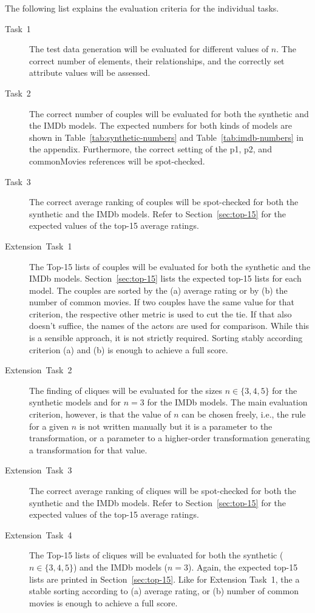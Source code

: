 \documentclass[a4paper,11pt]{article}
\newcommand{\p}[1]{\textsf{\small #1}}
\begin{document}
The following list explains the evaluation criteria for the individual tasks.

\begin{description}
\item[Task~1] The test data generation will be evaluated for different values
  of \(n\).  The correct number of elements, their relationships, and the
  correctly set attribute values will be assessed.
\item[Task~2] The correct number of couples will be evaluated for both the
  synthetic and the IMDb models.  The expected numbers for both kinds of models
  are shown in Table~\ref{tab:synthetic-numbers} and
  Table~\ref{tab:imdb-numbers} in the appendix.  Furthermore, the correct
  setting of the \p{p1}, \p{p2}, and \p{commonMovies} references will be
  spot-checked.
\item[Task~3] The correct average ranking of couples will be spot-checked for
  both the synthetic and the IMDb models.  Refer to Section~\ref{sec:top-15}
  for the expected values of the top-15 average ratings.
\item[Extension~Task~1] The Top-15 lists of couples will be evaluated for both
  the synthetic and the IMDb models.  Section~\ref{sec:top-15} lists the
  expected top-15 lists for each model.  The couples are sorted by the (a)
  average rating or by (b) the number of common movies.  If two couples have
  the same value for that criterion, the respective other metric is used to cut
  the tie.  If that also doesn't suffice, the names of the actors are used for
  comparison.  While this is a sensible approach, it is not strictly required.
  Sorting stably according criterion (a) and (b) is enough to achieve a full
  score.
\item[Extension~Task~2] The finding of cliques will be evaluated for the sizes
  \(n \in \{3,4,5\}\) for the synthetic models and for \(n=3\) for the IMDb
  models.  The main evaluation criterion, however, is that the value of \(n\)
  can be chosen freely, i.e., the rule for a given \(n\) is not written
  manually but it is a parameter to the transformation, or a parameter to a
  higher-order transformation generating a transformation for that value.
\item[Extension~Task~3] The correct average ranking of cliques will be
  spot-checked for both the synthetic and the IMDb models.  Refer to
  Section~\ref{sec:top-15} for the expected values of the top-15 average
  ratings.
\item[Extension~Task~4] The Top-15 lists of cliques will be evaluated for both
  the synthetic (\(n \in \{3,4,5\}\)) and the IMDb models (\(n=3\)).  Again,
  the expected top-15 lists are printed in Section~\ref{sec:top-15}.  Like for
  Extension Task~1, the a stable sorting according to (a) average rating, or
  (b) number of common movies is enough to achieve a full score.
\end{description}
\end{document}
